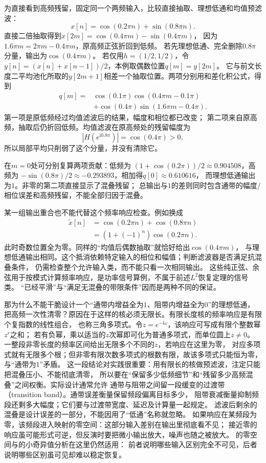 为直接看到高频残留，固定同一个两频输入，比较直接抽取、理想低通和均值预滤波：
\[
  x[n]=\cos(0.2\pi n)+\sin(0.8\pi n).
\]
直接二倍抽取得到$x[2m]=\cos(0.4\pi m)-\sin(0.4\pi m)$，
因为$1.6\pi m=2\pi m-0.4\pi m$，原高频正弦折回到低频。
若先理想低通、完全删除$0.8\pi$分量，输出为$\cos(0.4\pi m)$。
若仅用$h=(1/2,1/2)$，令$y[n]=(x[n]+x[n-1])/2$，本例取偶数位置$q[m]=y[2m]$。
它与前文长度二平均池化所取的$y[2m+1]$相差一个抽取位置。两项分别用和差化积公式，得到
\[
 \begin{aligned}
  q[m]={}&\cos(0.1\pi)\cos(0.4\pi m-0.1\pi)\\
        &+\cos(0.4\pi)\sin(1.6\pi m-0.4\pi).
 \end{aligned}
\]
第一项是原低频经过均值滤波后的结果，幅度和相位都已改变；
第二项来自原高频，抽取后仍折回低频。均值滤波在原高频处的残留幅度为
\[
  |H(e^{\mathrm i0.8\pi})|=\cos(0.4\pi)>0,
\]
所以局部平均只削弱了这个分量，并没有清除它。

在$m=0$处可分别复算两项贡献：低频为
$(1+\cos(0.2\pi))/2\approx0.904508$，高频为
$-\sin(0.8\pi)/2\approx-0.293893$，相加得$q[0]\approx0.610616$，
而理想低通输出为$1$。非零的第二项直接显示了混叠残留；
总输出与$1$的差则同时包含通带的幅度/相位误差和高频残留，不能全部归因于混叠。

某一组输出重合也不能代替这个频率响应检查。例如换成
\[
 \begin{aligned}
  \widetilde x[n]&=\cos(0.2\pi n)+\cos(0.8\pi n)\\
                 &=(1+(-1)^n)\cos(0.2\pi n).
 \end{aligned}
\]
此时奇数位置全为零。同样的“均值后偶数抽取”就恰好给出$\cos(0.4\pi m)$，
与理想低通输出相同。这个抵消依赖特定输入的相位和幅值；判断滤波器是否满足抗混叠条件，
仍需检查整个允许输入类，而不能只看一次相同输出。
这些纯正弦、余弦用于按模式计算频率响应，是功率信号算例，不属于前述$L^2$恢复定理的信号类。
“已经平滑”与“满足无混叠的带限条件”因而是两种不同的保证。

那为什么不能干脆设计一个“通带内增益全为$1$、阻带内增益全为$0$”的理想低通，
把高频一次性清零？原因在于这样的核必须无限长。有限长度核的频率响应是有限个复指数的线性组合，
也称三角多项式。令$z=e^{-\mathrm i\omega}$，该响应可写成有限个整数幂$z^r$之和；
若有负幂，乘以适当的$z$次幂即可化为普通多项式，而单位圆上$z\neq0$。
一整段非零长度的频率区间给出无限多个不同的$z$，若响应在这里为零，
对应多项式就有无限多个根；但非零有限次数多项式的根数有限，故该多项式只能恒为零，
与“通带为$1$”矛盾。
这一段结论对实践很重要：用有限长的核做预滤波，注定只能把混叠压小、不能彻底清零，
所以要在“保留多少低频细节”和“残留多少高频混叠”之间权衡。实际设计通常允许
通带与阻带之间留一段缓变的过渡带（transition band）。通带误差衡量保留频段偏离目标多少，
阻带衰减衡量抑制频段还剩多大幅度；它们要与过渡带宽度、延迟及计算量一起规定。
滤波后剩余的混叠是设计误差的一部分，不能因用了“低通”名称就忽略。
如果响应在某频段为零，该频段进入映射的零空间：这部分输入差别在输出里彻底看不见；
接近零的响应虽可能形式可逆，但反演时要把微小输出放大，噪声也随之被放大。
的零空间与的小奇异值分析在这里仍然适用：
前者说明哪些输入区别完全不可见，后者说明哪些区别虽可见却难以稳定恢复。

